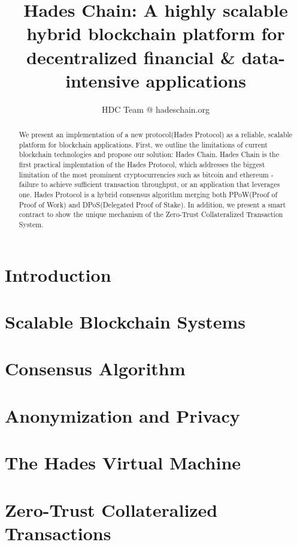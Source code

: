 \documentclass[
a4paper, %
11pt, %
onecolumn, %
openany, %
]{memoir}
\author{HDC Team @ hadeschain.org}
\title{Hades Chain: A highly scalable hybrid blockchain platform for decentralized financial \& data-intensive applications}
\begin{document}
\frontmatter

\maketitle

\begin{abstract}
We present an implementation of a new protocol(Hades Protocol) as a reliable, scalable platform for blockchain applications. First, we outline the limitations of current blockchain technologies and propose our solution: Hades Chain. Hades Chain is the first practical implemtation of the Hades Protocol, which addresses the biggest limitation of the most prominent cryptocurrencies such as bitcoin and ethereum - failure to achieve sufficient transaction throughput, or an application that leverages one. Hades Protocol is a hybrid consensus algorithm merging both PPoW(Proof of Proof of Work) and DPoS(Delegated Proof of Stake). In addition, we present a smart contract to show the unique mechanism of the Zero-Trust Collateralized Transaction System. 
\end{abstract}
\clearpage

\tableofcontents*

\clearpage

\chapter{Introduction}


\mainmatter


\chapter{Scalable Blockchain Systems}
\lipsum[1-10]
\chapter{Consensus Algorithm}

\lipsum[10 -25]
\chapter{Anonymization and Privacy}
\lipsum[20 -35]
\chapter{The Hades Virtual Machine}
\lipsum[30 -45]
\chapter{Zero-Trust Collateralized Transactions}
\lipsum[40 -55]
\end{document}
